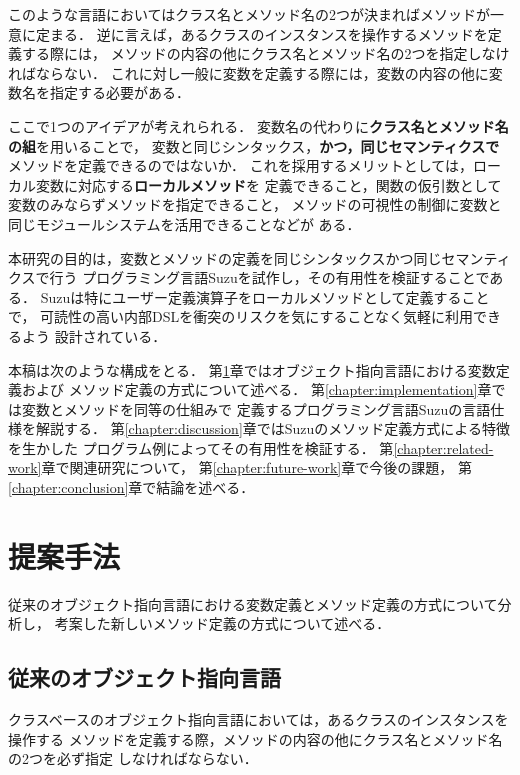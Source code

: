 \documentclass[a4paper,11pt,dvipdfmx]{jreport}
\begin{document}
このような言語においてはクラス名とメソッド名の2つが決まればメソッドが一意に定まる．
逆に言えば，あるクラスのインスタンスを操作するメソッドを定義する際には，
メソッドの内容の他にクラス名とメソッド名の2つを指定しなければならない．
これに対し一般に変数を定義する際には，変数の内容の他に変数名を指定する必要がある．

ここで1つのアイデアが考えれられる．
変数名の代わりに\textbf{クラス名とメソッド名の組}を用いることで，
変数と同じシンタックス，\textbf{かつ，同じセマンティクスで}
メソッドを定義できるのではないか．
これを採用するメリットとしては，ローカル変数に対応する\textbf{ローカルメソッド}を
定義できること，関数の仮引数として変数のみならずメソッドを指定できること，
メソッドの可視性の制御に変数と同じモジュールシステムを活用できることなどが
ある．

本研究の目的は，変数とメソッドの定義を同じシンタックスかつ同じセマンティクスで行う
プログラミング言語Suzuを試作し，その有用性を検証することである．
Suzuは特にユーザー定義演算子をローカルメソッドとして定義することで，
可読性の高い内部DSLを衝突のリスクを気にすることなく気軽に利用できるよう
設計されている．

本稿は次のような構成をとる．
第\ref{chapter:proposal}章ではオブジェクト指向言語における変数定義および
メソッド定義の方式について述べる．
第\ref{chapter:implementation}章では変数とメソッドを同等の仕組みで
定義するプログラミング言語Suzuの言語仕様を解説する．
第\ref{chapter:discussion}章ではSuzuのメソッド定義方式による特徴を生かした
プログラム例によってその有用性を検証する．
第\ref{chapter:related-work}章で関連研究について，
第\ref{chapter:future-work}章で今後の課題，
第\ref{chapter:conclusion}章で結論を述べる．


\chapter{提案手法}
\label{chapter:proposal}

従来のオブジェクト指向言語における変数定義とメソッド定義の方式について分析し，
考案した新しいメソッド定義の方式について述べる．

\section{従来のオブジェクト指向言語}

クラスベースのオブジェクト指向言語においては，あるクラスのインスタンスを操作する
メソッドを定義する際，メソッドの内容の他にクラス名とメソッド名の2つを必ず指定
しなければならない．
\end{document}
